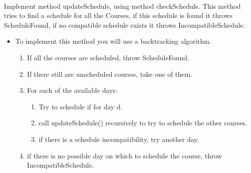 \documentclass{exercices}
\begin{document}
\begin{exercice}\\
Implement method updateSchedule, using method checkSchedule.
This method tries to find a schedule for all the Courses, if this schedule is found it throws
ScheduleFound, if no compatible schedule exists it throws IncompatibleSchedule.

\begin{itemize}
\item To implement this method you will use a backtracking algorithm. 
\begin{enumerate}
  \item If all the courses are scheduled, throw ScheduleFound.
  \item If there still are unscheduled courses, take one of them.
  \item For each of the available days:
  \begin{enumerate}
    \item Try to schedule if for day d.
    \item call updateSchedule() recursively to try to schedule the other courses.
    \item if there is a schedule incompatibility, try another day.
  \end{enumerate}
  \item if there is no possible day on which to schedule the course, throw IncompatibleSchedule. 
\end{enumerate}
\end{itemize}
\end{exercice}
\end{document}
